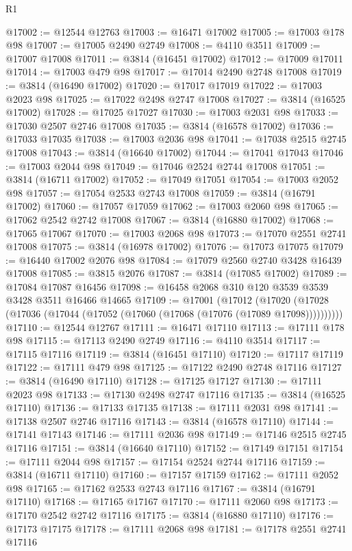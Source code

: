 \begin{lexlean}{R1}
\begin{coremodule}
@17002 := @12544 @12763
@17003 := @16471 @17002
@17005 := @17003 @178 @98
@17007 := @17005 @2490 @2749
@17008 := @4110 @3511
@17009 := @17007 @17008
@17011 := @3814 (@16451 @17002)
@17012 := @17009 @17011
@17014 := @17003 @479 @98
@17017 := @17014 @2490 @2748 @17008
@17019 := @3814 (@16490 @17002)
@17020 := @17017 @17019
@17022 := @17003 @2023 @98
@17025 := @17022 @2498 @2747 @17008
@17027 := @3814 (@16525 @17002)
@17028 := @17025 @17027
@17030 := @17003 @2031 @98
@17033 := @17030 @2507 @2746 @17008
@17035 := @3814 (@16578 @17002)
@17036 := @17033 @17035
@17038 := @17003 @2036 @98
@17041 := @17038 @2515 @2745 @17008
@17043 := @3814 (@16640 @17002)
@17044 := @17041 @17043
@17046 := @17003 @2044 @98
@17049 := @17046 @2524 @2744 @17008
@17051 := @3814 (@16711 @17002)
@17052 := @17049 @17051
@17054 := @17003 @2052 @98
@17057 := @17054 @2533 @2743 @17008
@17059 := @3814 (@16791 @17002)
@17060 := @17057 @17059
@17062 := @17003 @2060 @98
@17065 := @17062 @2542 @2742 @17008
@17067 := @3814 (@16880 @17002)
@17068 := @17065 @17067
@17070 := @17003 @2068 @98
@17073 := @17070 @2551 @2741 @17008
@17075 := @3814 (@16978 @17002)
@17076 := @17073 @17075
@17079 := @16440 @17002 @2076 @98
@17084 := @17079 @2560 @2740 @3428 @16439 @17008
@17085 := @3815 @2076
@17087 := @3814 (@17085 @17002)
@17089 := @17084 @17087 @16456
@17098 := @16458 @2068 @310 @120 @3539 @3539 @3428 @3511 @16466 @14665
@17109 := @17001
    (@17012 (@17020 (@17028 (@17036 (@17044 (@17052 (@17060 (@17068 (@17076 (@17089 @17098))))))))))
@17110 := @12544 @12767
@17111 := @16471 @17110
@17113 := @17111 @178 @98
@17115 := @17113 @2490 @2749
@17116 := @4110 @3514
@17117 := @17115 @17116
@17119 := @3814 (@16451 @17110)
@17120 := @17117 @17119
@17122 := @17111 @479 @98
@17125 := @17122 @2490 @2748 @17116
@17127 := @3814 (@16490 @17110)
@17128 := @17125 @17127
@17130 := @17111 @2023 @98
@17133 := @17130 @2498 @2747 @17116
@17135 := @3814 (@16525 @17110)
@17136 := @17133 @17135
@17138 := @17111 @2031 @98
@17141 := @17138 @2507 @2746 @17116
@17143 := @3814 (@16578 @17110)
@17144 := @17141 @17143
@17146 := @17111 @2036 @98
@17149 := @17146 @2515 @2745 @17116
@17151 := @3814 (@16640 @17110)
@17152 := @17149 @17151
@17154 := @17111 @2044 @98
@17157 := @17154 @2524 @2744 @17116
@17159 := @3814 (@16711 @17110)
@17160 := @17157 @17159
@17162 := @17111 @2052 @98
@17165 := @17162 @2533 @2743 @17116
@17167 := @3814 (@16791 @17110)
@17168 := @17165 @17167
@17170 := @17111 @2060 @98
@17173 := @17170 @2542 @2742 @17116
@17175 := @3814 (@16880 @17110)
@17176 := @17173 @17175
@17178 := @17111 @2068 @98
@17181 := @17178 @2551 @2741 @17116

\end{coremodule}
\end{lexlean}
